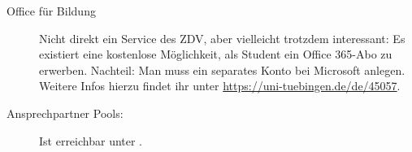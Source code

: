 \begin{description}
   \item[Office für Bildung] Nicht direkt ein Service des ZDV, aber vielleicht trotzdem interessant: Es existiert eine kostenlose Möglichkeit, als Student ein Office 365-Abo zu erwerben. Nachteil: Man muss ein separates Konto bei Microsoft anlegen. Weitere Infos hierzu findet ihr unter \url{https://uni-tuebingen.de/de/45057}.	%

  \item[Ansprechpartner Pools:]
    Ist erreichbar unter .

	
\end{description}
